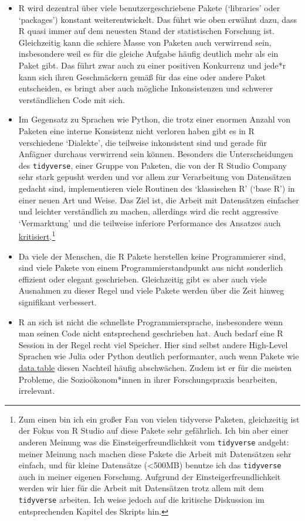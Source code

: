 \documentclass[]{book}
\let\rmarkdownfootnote\footnote%
\def\footnote{\protect\rmarkdownfootnote}
\begin{document}
\begin{itemize}
\item
  R wird dezentral über viele benutzergeschriebene Pakete (`libraries'
  oder `packages') konstant weiterentwickelt. Das führt wie oben erwähnt
  dazu, dass R quasi immer auf dem neuesten Stand der statistischen
  Forschung ist. Gleichzeitig kann die schiere Masse von Paketen auch
  verwirrend sein, insbesondere weil es für die gleiche Aufgabe häufig
  deutlich mehr als ein Paket gibt. Das führt zwar auch zu einer
  positiven Konkurrenz und jede*r kann sich ihren Geschmäckern gemäß für
  das eine oder andere Paket entscheiden, es bringt aber auch mögliche
  Inkonsistenzen und schwerer verständlichen Code mit sich.
\item
  Im Gegensatz zu Sprachen wie Python, die trotz einer enormen Anzahl
  von Paketen eine interne Konsistenz nicht verloren haben gibt es in R
  verschiedene `Dialekte', die teilweise inkonsistent sind und gerade
  für Anfägner durchaus verwirrend sein können. Besonders die
  Unterscheidungen des \texttt{tidyverse}, einer Gruppe von Paketen, die
  von der R Studio Company sehr stark gepusht werden und vor allem zur
  Verarbeitung von Datensätzen gedacht sind, implementieren viele
  Routinen des `klassischen R' (`base R') in einer neuen Art und Weise.
  Das Ziel ist, die Arbeit mit Datensätzen einfacher und leichter
  verständlich zu machen, allerdings wird die recht aggressive
  `Vermarktung' und die teilweise inferiore Performance des Ansatzes
  auch
  \href{https://github.com/matloff/TidyverseSkeptic}{kritisiert}.\footnote{Zum
    einen bin ich ein großer Fan von vielen tidyverse Paketen,
    gleichzeitig ist der Fokus von R Studio auf diese Pakete sehr
    gefährlich. Ich bin aber einer anderen Meinung was die
    Einsteigerfreundlichkeit vom \texttt{tidyverse} andgeht: meiner
    Meinung nach machen diese Pakete die Arbeit mit Datensätzen sehr
    einfach, und für kleine Datensätze (\textless{}500MB) benutze ich
    das \texttt{tidyverse} auch in meiner eigenen Forschung. Aufgrund
    der Einsteigerfreundlichkeit werden wir hier für die Arbeit mit
    Datensätzen trotz allem mit dem \texttt{tidyverse} arbeiten. Ich
    weise jedoch auf die kritische Diskussion im entsprechenden Kapitel
    des Skripts hin.}
\item
  Da viele der Menschen, die R Pakete herstellen keine Programmierer
  sind, sind viele Pakete von einem Programmierstandpunkt aus nicht
  sonderlich effizient oder elegant geschrieben. Gleichzeitig gibt es
  aber auch viele Ausnahmen zu dieser Regel und viele Pakete werden über
  die Zeit hinweg signifikant verbessert.
\item
  R an sich ist nicht die schnellste Programmiersprache, insbesondere
  wenn man seinen Code nicht entsprechend geschrieben hat. Auch bedarf
  eine R Session in der Regel recht viel Speicher. Hier sind selbst
  andere High-Level Sprachen wie Julia oder Python deutlich
  performanter, auch wenn Pakete wie
  \href{https://rdatatable.gitlab.io/data.table/}{data.table} diesen
  Nachteil häufig abschwächen. Zudem ist er für die meisten Probleme,
  die Sozioökonom*innen in ihrer Forschungspraxis bearbeiten,
  irrelevant.
\end{itemize}
\end{document}

